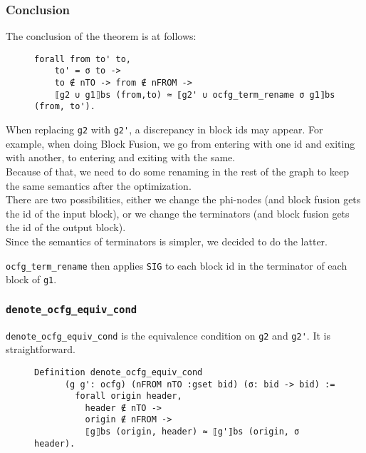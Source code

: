 \documentclass[11pt]{article}
\newcommand{\inlinecoq}[1]{\mbox{\lstinline[style=customcoq,columns=fixed,basewidth=.48em]{#1}}}
\newcommand{\ilc}[1]{\inlinecoq{#1}}
\begin{document}
\subsubsection{Conclusion}

The conclusion of the theorem is at follows: \begin{figure}[H]
  \begin{lstlisting}[style=customcoq,basicstyle=\small\ttfamily]
    forall from to' to,
    to' = σ to ->
    to ∉ nTO -> from ∉ nFROM ->
    ⟦g2 ∪ g1⟧bs (from,to) ≈ ⟦g2' ∪ ocfg_term_rename σ g1⟧bs (from, to').
  \end{lstlisting}
\end{figure}

When replacing \ilc{g2} with \ilc{g2'}, a discrepancy in block ids may appear. For example, when doing Block Fusion, we go from entering with one id and exiting with another, to entering and exiting with the same.\\
Because of that, we need to do some renaming in the rest of the graph to keep the same semantics after the optimization.\\
There are two possibilities, either we change the phi-nodes (and block fusion gets the id of the input block), or we change the terminators (and block fusion gets the id of the output block).\\
Since the semantics of terminators is simpler, we decided to do the latter.

\ilc{ocfg_term_rename} then applies \ilc{SIG} to each block id in the terminator of each block of \ilc{g1}.

\subsubsection{\ilc{denote_ocfg_equiv_cond}}

\ilc{denote_ocfg_equiv_cond} is the equivalence condition on \ilc{g2} and \ilc{g2'}. It is straightforward.

\begin{figure}[H]
  \begin{lstlisting}[style=customcoq,basicstyle=\small\ttfamily]
    Definition denote_ocfg_equiv_cond
      (g g': ocfg) (nFROM nTO :gset bid) (σ: bid -> bid) :=
        forall origin header,
          header ∉ nTO ->
          origin ∉ nFROM ->
          ⟦g⟧bs (origin, header) ≈ ⟦g'⟧bs (origin, σ header).
  \end{lstlisting}
\end{figure}
\end{document}

